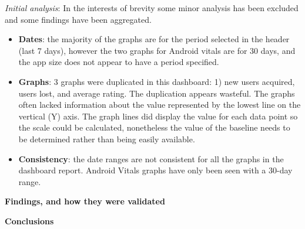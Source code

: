 \textit{Initial analysis}: In the interests of brevity some minor analysis has been excluded and some findings have been aggregated. 

\begin{itemize}
    \item \textbf{Dates}: the majority of the graphs are for the period selected in the header (last 7 days), however the two graphs for Android vitals are for 30 days, and the app size does not appear to have a period specified.
    \item \textbf{Graphs}: 3 graphs were duplicated in this dashboard: 1) new users acquired, users lost, and average rating. The duplication appears wasteful. The graphs often lacked information about the value represented by the lowest line on the vertical (Y) axis. The graph lines did display the value for each data point so the scale could be calculated, nonetheless the value of the baseline needs to be determined rather than being easily available.
    \item \textbf{Consistency}: the date ranges are not consistent for all the graphs in the dashboard report. Android Vitals graphs have only been seen with a 30-day range.
    
\end{itemize}


\textbf{Findings, and how they were validated}

\textbf{Conclusions}